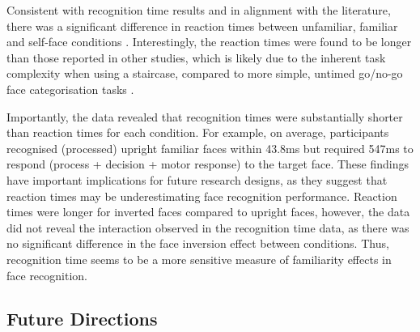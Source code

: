 \documentclass[
  authoryear,
  review,
  3p,
  onecolumn]{elsarticle}
\begin{document}
Consistent with recognition time results and in alignment with the
literature, there was a significant difference in reaction times between
unfamiliar, familiar and self-face conditions
\citep{kloth2006a, ramon2011a, young2017a}. Interestingly, the reaction
times were found to be longer than those reported in other studies,
which is likely due to the inherent task complexity when using a
staircase, compared to more simple, untimed go/no-go face categorisation
tasks \citep{bortolon2017a, burton2016a, ramon2011a, smith2016a}.

Importantly, the data revealed that recognition times were substantially
shorter than reaction times for each condition. For example, on average,
participants recognised (processed) upright familiar faces within 43.8ms
but required 547ms to respond (process + decision + motor response) to
the target face. These findings have important implications for future
research designs, as they suggest that reaction times may be
underestimating face recognition performance. Reaction times were longer
for inverted faces compared to upright faces, however, the data did not
reveal the interaction observed in the recognition time data, as there
was no significant difference in the face inversion effect between
conditions. Thus, recognition time seems to be a more sensitive measure
of familiarity effects in face recognition.

\subsection{Future Directions}\label{future-directions}
\end{document}
